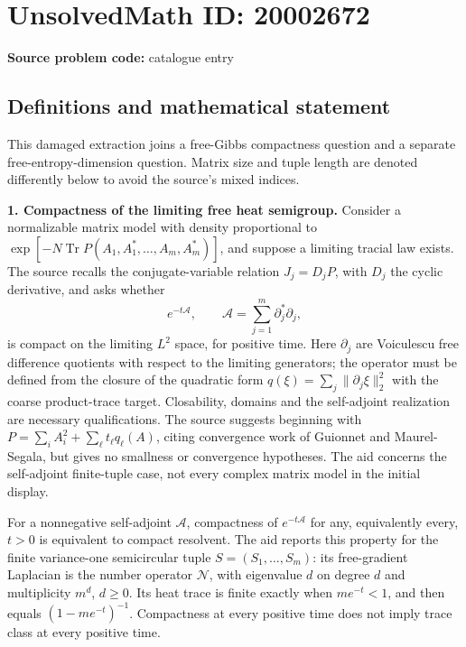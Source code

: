 \documentclass[11pt]{article}
\begin{document}
\section*{UnsolvedMath ID: 20002672}
\textbf{Source problem code:} catalogue entry
\subsection{Definitions and mathematical statement}
This damaged extraction joins a free-Gibbs compactness question and a separate free-entropy-dimension question. Matrix size and tuple length are denoted differently below to avoid the source's mixed indices.

\textbf{1. Compactness of the limiting free heat semigroup.} Consider a normalizable matrix model with density proportional to \(\exp[-N\operatorname{Tr}P(A_1,A_1^*,\ldots,A_m,A_m^*)]\), and suppose a limiting tracial law exists. The source recalls the conjugate-variable relation \(J_j=D_jP\), with \(D_j\) the cyclic derivative, and asks whether
\[
 e^{-t\mathcal A},\qquad \mathcal A=\sum_{j=1}^m\partial_j^*\partial_j,
\]
is compact on the limiting \(L^2\) space, for positive time. Here \(\partial_j\) are Voiculescu free difference quotients with respect to the limiting generators; the operator must be defined from the closure of the quadratic form \(q(\xi)=\sum_j\|\partial_j\xi\|_2^2\) with the coarse product-trace target. Closability, domains and the self-adjoint realization are necessary qualifications. The source suggests beginning with \(P=\sum_iA_i^2+\sum_\ell t_\ell q_\ell(A)\), citing convergence work of Guionnet and Maurel-Segala, but gives no smallness or convergence hypotheses. The aid concerns the self-adjoint finite-tuple case, not every complex matrix model in the initial display.

For a nonnegative self-adjoint \(\mathcal A\), compactness of \(e^{-t\mathcal A}\) for any, equivalently every, \(t>0\) is equivalent to compact resolvent. The aid reports this property for the finite variance-one semicircular tuple \(S=(S_1,\ldots,S_m)\): its free-gradient Laplacian is the number operator \(\mathcal N\), with eigenvalue \(d\) on degree \(d\) and multiplicity \(m^d\), \(d\ge0\). Its heat trace is finite exactly when \(me^{-t}<1\), and then equals \((1-me^{-t})^{-1}\). Compactness at every positive time does not imply trace class at every positive time.
\end{document}
